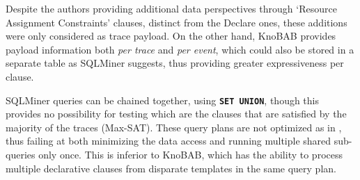 {Despite the authors} providing additional {data} perspectives through `Resource Assignment Constraints' clauses, distinct from the Declare ones, these additions were only considered  {as trace payload}. On the other hand, KnoBAB provides payload information {both \emph{per trace}} and \emph{per event}, which could also be stored in a separate table as SQLMiner suggests, thus providing greater expressiveness per clause.

SQLMiner queries can be chained together, using \texttt{\textbf{SET UNION}}, though this provides no possibility for testing which are the clauses that are satisfied by the majority of the traces (Max-SAT). These query plans are not optimized as in \cite{BellatrecheKB21}, thus failing at both minimizing the data access
and running multiple shared sub-queries only once.
This is inferior to KnoBAB, which has the ability to process multiple 
declarative clauses from disparate templates in the same query plan.
